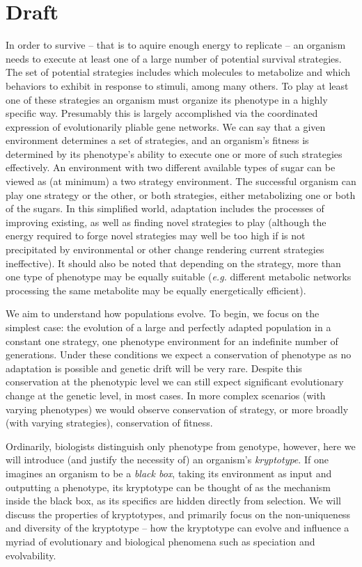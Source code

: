 \documentclass[11 pt]{article}
\newcommand{\1}{\mathbbm{1}}
\begin{document}
  \section{Draft}

  In order to survive -- that is to aquire enough energy to replicate -- an organism needs to execute at least one of a large number of potential survival strategies. The set of potential strategies includes which molecules to metabolize and which behaviors to exhibit in response to stimuli, among many others. To play at least one of these strategies an organism must organize its phenotype in a highly specific way. Presumably this is largely accomplished via the coordinated expression of evolutionarily pliable gene networks. We can say that a given environment determines a set of strategies, and an organism's fitness is determined by its phenotype's ability to execute one or more of such strategies effectively. An environment with two different available types of sugar can be viewed as (at minimum)  a two strategy environment. The successful organism can play one strategy or the other, or both strategies, either metabolizing one or both of the sugars. In this simplified world, adaptation includes the processes of improving existing, as well as finding novel strategies to play (although the energy required to forge novel strategies may well be too high if is not precipitated by environmental or other change rendering current strategies ineffective). It should also be noted that depending on the strategy, more than one type of phenotype may be equally suitable (\emph{e.g.} different metabolic networks processing the same metabolite may be equally energetically efficient).

  We aim to understand how populations evolve. To begin, we focus on the simplest case: the evolution of a large and perfectly adapted population in a constant one strategy, one phenotype environment for an indefinite number of generations. Under these conditions we expect a conservation of phenotype as no adaptation is possible and genetic drift will be very rare. Despite this conservation at the phenotypic level we can still expect significant evolutionary change at the genetic level, in most cases. In more complex scenarios (with varying phenotypes) we would observe conservation of strategy, or more broadly (with varying strategies), conservation of fitness. 

   Ordinarily, biologists distinguish only phenotype from genotype, however, here we will introduce (and justify the necessity of) an organism's \emph{kryptotype}. If one imagines an organism to be a \emph{black box}, taking its environment as input and outputting a phenotype, its kryptotype can be thought of as the mechanism inside the black box, as its specifics are hidden directly from selection. We will discuss the properties of kryptotypes, and primarily focus on the non-uniqueness and diversity of the kryptotype -- how the kryptotype can evolve and influence a myriad of evolutionary and biological phenomena such as speciation and evolvability.
\end{document}
